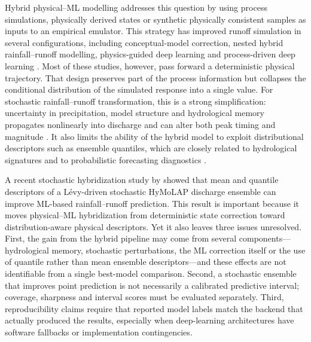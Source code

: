 Hybrid physical--ML modelling addresses this question by using process
simulations, physically derived states or synthetic physically
consistent samples as inputs to an empirical emulator. This strategy has
improved runoff simulation in several configurations, including
conceptual-model correction, nested hybrid rainfall--runoff modelling,
physics-guided deep learning and process-driven deep learning
\citep{mekonnen2015hybrid,mohammadi2022ihacres,okkan2021embedding,yang2020physical,xie2021physics,li2024process,zhu2025hybrid}.
Most of these studies, however, pass forward a deterministic physical
trajectory. That design preserves part of the process information but
collapses the conditional distribution of the simulated response into a
single value. For stochastic rainfall--runoff transformation, this is a
strong simplification: uncertainty in precipitation, model structure and
hydrological memory propagates nonlinearly into discharge and can alter
both peak timing and magnitude
\citep{gabellani2007propagation,hong2006uncertainty}. It also limits the
ability of the hybrid model to exploit distributional descriptors such
as ensemble quantiles, which are closely related to hydrological
signatures and to probabilistic forecasting diagnostics
\citep{guo2021regionalization,papacharalampous2022review}.

A recent stochastic hybridization study by
\citet{houenafa2025hybridization} showed that mean and quantile
descriptors of a L\'{e}vy-driven stochastic HyMoLAP discharge ensemble
can improve ML-based rainfall--runoff prediction. This result is
important because it moves physical--ML hybridization from deterministic
state correction toward distribution-aware physical descriptors. Yet it
also leaves three issues unresolved. First, the gain from the hybrid
pipeline may come from several components---hydrological memory,
stochastic perturbations, the ML correction itself or the use of
quantile rather than mean ensemble descriptors---and these effects are
not identifiable from a single best-model comparison. Second, a
stochastic ensemble that improves point prediction is not necessarily a
calibrated predictive interval; coverage, sharpness and interval scores
must be evaluated separately. Third, reproducibility claims require that
reported model labels match the backend that actually produced the
results, especially when deep-learning architectures have software
fallbacks or implementation contingencies.

